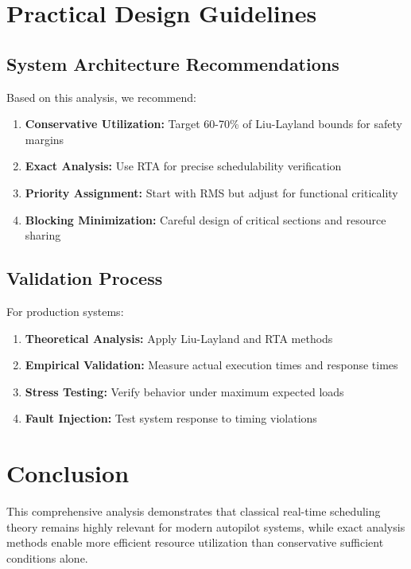 \documentclass[12pt,a4paper]{article}
\begin{document}
\section{Practical Design Guidelines}

\subsection{System Architecture Recommendations}

Based on this analysis, we recommend:

\begin{enumerate}
\item \textbf{Conservative Utilization:} Target 60-70\% of Liu-Layland bounds for safety margins
\item \textbf{Exact Analysis:} Use RTA for precise schedulability verification
\item \textbf{Priority Assignment:} Start with RMS but adjust for functional criticality
\item \textbf{Blocking Minimization:} Careful design of critical sections and resource sharing
\end{enumerate}

\subsection{Validation Process}

For production systems:

\begin{enumerate}
\item \textbf{Theoretical Analysis:} Apply Liu-Layland and RTA methods
\item \textbf{Empirical Validation:} Measure actual execution times and response times
\item \textbf{Stress Testing:} Verify behavior under maximum expected loads
\item \textbf{Fault Injection:} Test system response to timing violations
\end{enumerate}

\section{Conclusion}

This comprehensive analysis demonstrates that classical real-time scheduling theory remains highly relevant for modern autopilot systems, while exact analysis methods enable more efficient resource utilization than conservative sufficient conditions alone.
\end{document}
